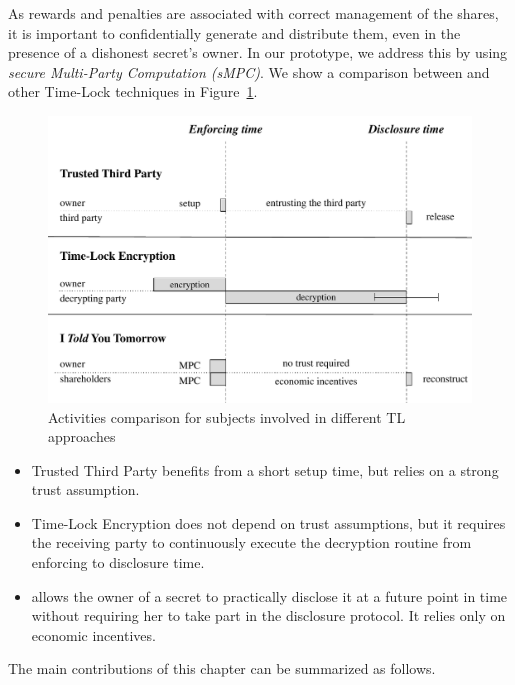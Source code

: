 As rewards and penalties are associated with correct management of the shares, it is important to confidentially generate and distribute them, even in the presence of a dishonest secret's owner.
In our prototype, we address this by using {\em secure Multi-Party Computation (sMPC)}.
%
We show a comparison between \shortname  and other Time-Lock techniques in Figure~\ref{fig:models}.

\begin{figure}[t]
	\centering
	\includegraphics[width=1.0\textwidth]{fig/models}
	\caption{Activities comparison for subjects involved in different TL approaches}
	\label{fig:models}
\end{figure}


\begin{itemize}
	\item Trusted Third Party benefits from a short setup time,
          but relies on a strong trust assumption.
	
	\item Time-Lock Encryption does not depend on trust assumptions, but it requires the receiving party to continuously execute the decryption routine from enforcing to disclosure time.
	
	\item {\em \name} allows the owner of a secret to practically disclose it at a future point in time without requiring her to take part in the disclosure protocol. It relies only on economic incentives.
\end{itemize}

\noindent The main contributions of this chapter can be summarized as follows.

